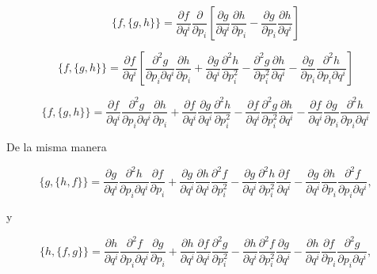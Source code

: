 \documentclass[a4paper,10pt]{article}
\numberwithin{equation}{section}
\begin{document}
\begin{equation}
  \{f,\{g,h\}\} = \frac{\partial f}{\partial q^i}\frac{\partial }{\partial p_i}\left[
   \frac{\partial g}{\partial q^i}\frac{\partial h}{\partial p_i} - 
 \frac{\partial g}{\partial p_i}\frac{\partial h}{\partial q^i}\right]
\end{equation}

\begin{equation}
  \{f,\{g,h\}\} = \frac{\partial f}{\partial q^i}\left[
  \frac{\partial^2 g}{\partial p_i\partial q^i}\frac{\partial h}{\partial p_i} 
  + \frac{\partial g}{\partial q^i}\frac{\partial^2 h}{\partial p_i^2} 
  - \frac{\partial^2 g}{\partial p_i^2}\frac{\partial h}{\partial q^i} 
  - \frac{\partial g}{\partial p_i}\frac{\partial^2 h}{\partial p_i \partial q^i}\right]
\end{equation}

\begin{equation}
  \{f,\{g,h\}\} = \frac{\partial f}{\partial q^i}
  \frac{\partial^2 g}{\partial p_i\partial q^i}\frac{\partial h}{\partial p_i} 
  + \frac{\partial f}{\partial q^i}
  \frac{\partial g}{\partial q^i}\frac{\partial^2 h}{\partial p_i^2} 
  -\frac{\partial f}{\partial q^i}
  \frac{\partial^2 g}{\partial p_i^2}\frac{\partial h}{\partial q^i} 
  -\frac{\partial f}{\partial q^i} 
  \frac{\partial g}{\partial p_i}\frac{\partial^2 h}{\partial p_i \partial q^i}
\end{equation}

De la misma manera 

\begin{equation}
  \{g,\{h,f\}\} = \frac{\partial g}{\partial q^i}
  \frac{\partial^2 h}{\partial p_i\partial q^i}\frac{\partial f}{\partial p_i} 
  + \frac{\partial g}{\partial q^i}
  \frac{\partial h}{\partial q^i}\frac{\partial^2 f}{\partial p_i^2} 
  -\frac{\partial g}{\partial q^i}
  \frac{\partial^2 h}{\partial p_i^2}\frac{\partial f}{\partial q^i} 
  -\frac{\partial g}{\partial q^i} 
  \frac{\partial h}{\partial p_i}\frac{\partial^2 f}{\partial p_i \partial q^i},
\end{equation}

y

\begin{equation}
  \{h,\{f,g\}\} = \frac{\partial h}{\partial q^i}
  \frac{\partial^2 f}{\partial p_i\partial q^i}\frac{\partial g}{\partial p_i} 
  + \frac{\partial h}{\partial q^i}
  \frac{\partial f}{\partial q^i}\frac{\partial^2 g}{\partial p_i^2} 
  -\frac{\partial h}{\partial q^i}
  \frac{\partial^2 f}{\partial p_i^2}\frac{\partial g}{\partial q^i} 
  -\frac{\partial h}{\partial q^i} 
  \frac{\partial f}{\partial p_i}\frac{\partial^2 g}{\partial p_i \partial q^i},
\end{equation}
\end{document}

